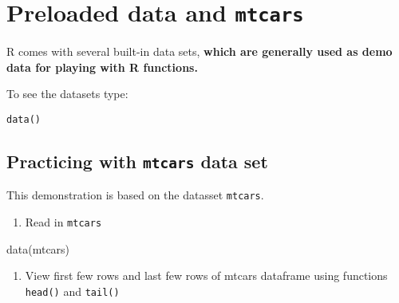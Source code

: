\documentclass[
]{book}
\newenvironment{Shaded}{\begin{snugshade}}{\end{snugshade}}
\newcommand{\FunctionTok}[1]{\textcolor[rgb]{0.00,0.00,0.00}{#1}}
\newcommand{\NormalTok}[1]{#1}
\providecommand{\tightlist}{%
  \setlength{\itemsep}{0pt}\setlength{\parskip}{0pt}}
\begin{document}
\hypertarget{preloaded-data-and-mtcars}{%
\chapter{\texorpdfstring{Preloaded data and \texttt{mtcars}}{Preloaded data and mtcars}}\label{preloaded-data-and-mtcars}}

R comes with several built-in data sets, \textbf{which are generally used as demo data for playing with R functions.}

To see the datasets type:

\texttt{data()}

\hypertarget{practicing-with-mtcars-data-set}{%
\section{\texorpdfstring{Practicing with \texttt{mtcars} data set}{Practicing with mtcars data set}}\label{practicing-with-mtcars-data-set}}

This demonstration is based on the datasset \texttt{mtcars}.

\begin{enumerate}
\def\labelenumi{\arabic{enumi}.}
\tightlist
\item
  Read in \texttt{mtcars}
\end{enumerate}

\begin{Shaded}
\begin{Highlighting}[]
\FunctionTok{data}\NormalTok{(mtcars)}
\end{Highlighting}
\end{Shaded}

\begin{enumerate}
\def\labelenumi{\arabic{enumi}.}
\setcounter{enumi}{1}
\tightlist
\item
  View first few rows and last few rows of mtcars dataframe using functions \texttt{head()} and \texttt{tail()}
\end{enumerate}
\end{document}
